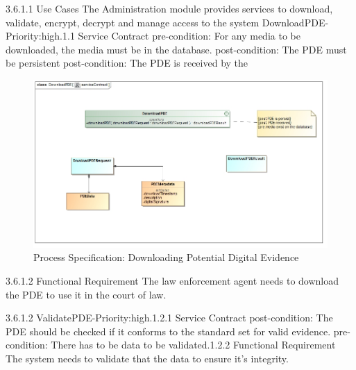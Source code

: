\documentclass[a4paper,12pt]{article}
\begin{document}
3.6.1.1 Use Cases\newline
The Administration module provides services to download, validate, encrypt, decrypt and manage access to the system\newline
DownloadPDE-Priority:high.1.1 Service Contract\newline
	pre-condition: For any media to be downloaded, the media must be in the database.\newline
	post-condition: The PDE must be persistent\newline
	post-condition: The PDE is received by the \newline
	\begin{figure}[H]
\includegraphics[width=\textwidth]{images/downloadserviceContract.jpg}
\caption{Process Specification: Downloading Potential Digital Evidence \label{overflow}}
\end{figure}
	3.6.1.2 Functional Requirement\newline
	The law enforcement agent needs to download the PDE to use it in the court of law. \newline
	
3.6.1.2 ValidatePDE-Priority:high.1.2.1 Service Contract\newline
	post-condition: The PDE should be checked if it conforms to the standard set for valid evidence.\newline
	pre-condition: There has to be data to be validated.1.2.2 Functional Requirement\newline
	The system needs to validate that the data to ensure it's integrity.\newline
	
\end{document}
